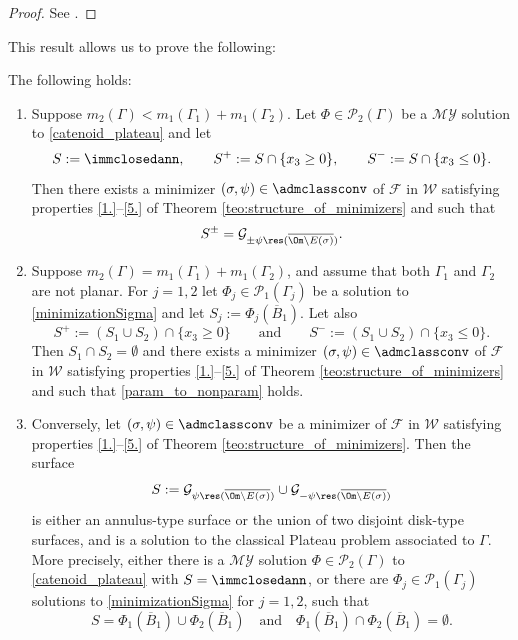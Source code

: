 \begin{proof}
See \cite{MY}.
\end{proof}
This result allows us to prove the following:
\begin{theorem}[The annulus-type Plateau problem ($n=2$)]
\label{teo:the_annulus_type_Plateau_problem_n=2}
The following holds:
\begin{enumerate}[{\rm(i)},wide]
\item \label{1plateau} Suppose $m_2(\Gamma)<m_1(\Gamma_1)+m_1(\Gamma_2)$.
Let $\Phi\in\mathcal{P}_2(\Gamma)$
be a $\mathcal{MY}$ solution to \eqref{catenoid_plateau} and let
\begin{equation*}
S:=\immclosedann, \qquad
S^+:=S\cap\{x_3\ge0\},\qquad
S^-:=S\cap\{x_3\le0\}.
\end{equation*}
Then there exists a minimizer $(\sigma,\psi)\in \admclassconv$
of $\mathcal F$ in $\mathcal W$ satisfying properties \ref{1.}--\ref{5.} of Theorem \ref{teo:structure_of_minimizers} and such that
\begin{equation}\label{param_to_nonparam}
S^{\pm}=\mathcal G_{\pm\psi\res (\overline{\Om\setminus E(\sigma)})}.
\end{equation}
\item\label{2plateau} Suppose $m_2(\Gamma)= m_1(\Gamma_1)+m_1(\Gamma_2)$, { and assume that both $\Gamma_1$ and $\Gamma_2$ are not planar}. For $j=1,2$ let $\Phi_j\in\mathcal{P}_1(\Gamma_j)$ be a solution to \eqref{minimizationSigma} and let $S_j:=\Phi_j(\overline B_1)$. Let also
\begin{equation*}
S^+:=(S_1\cup S_2)\cap\{x_3\ge0\}\qquad\text{and}\qquad
S^-:=(S_1\cup S_2)\cap\{x_3\le0\}.
\end{equation*}
Then $S_1\cap S_2=\emptyset$ and there exists a minimizer $(\sigma,\psi)\in \admclassconv$ of $\mathcal F$ in $\mathcal W$ satisfying properties \ref{1.}--\ref{5.} of Theorem \ref{teo:structure_of_minimizers} and such that \eqref{param_to_nonparam} holds.
\item \label{3plateau}
Conversely, let $(\sigma,\psi)\in \admclassconv$ be a minimizer of $\mathcal F$ in $\mathcal W$ satisfying properties \ref{1.}--\ref{5.} of Theorem \ref{teo:structure_of_minimizers}. Then the surface
\[
S:=\mathcal G_{\psi\res (\overline{\Om\setminus E(\sigma)})}\cup\mathcal G_{-\psi\res (\overline{\Om\setminus E(\sigma)})}
\]
is either an annulus-type surface or the union of two disjoint disk-type surfaces, and is a solution to the classical Plateau problem associated to $\Gamma$. More precisely, either there is a $\mathcal{MY}$ solution $\Phi\in\mathcal{P}_2(\Gamma)$ to \eqref{catenoid_plateau} with
$S=\immclosedann$, or there are $\Phi_j\in\mathcal{P}_1(\Gamma_j)$ solutions to \eqref{minimizationSigma} for $j=1,2$, such that
\[
S=\Phi_1(\overline B_1)\cup \Phi_2(\overline B_1)\quad\text{and}\quad\Phi_1(\overline B_1)\cap \Phi_2(\overline B_1)=\emptyset.
\]
\end{enumerate}
\end{theorem}

